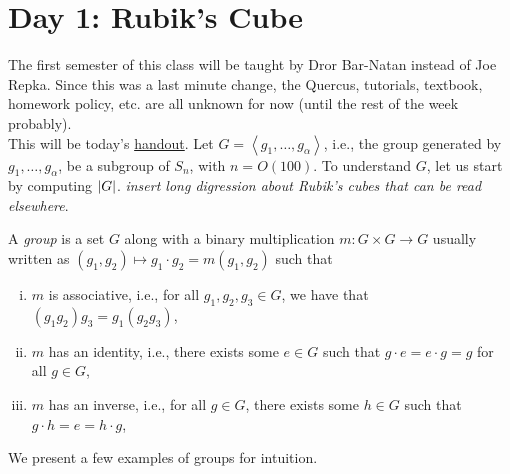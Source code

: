 \section{Day 1: Rubik's Cube}
The first semester of this class will be taught by Dror Bar-Natan instead of Joe Repka. Since this was a last minute change, the Quercus, tutorials, textbook, homework policy, etc. are all unknown for now (until the rest of the week probably).
\\[8pt]
This will be today's \href{https://www.math.toronto.edu/~drorbn/Talks/Cambridge-1301/}{handout}. Let $G = \left<g_1, \dots, g_\alpha\right>$, i.e., the group generated by $g_1, \dots, g_\alpha$, be a subgroup of $S_n$, with $n = O(100)$. To understand $G$, let us start by computing $\left\lvert G \right\rvert$. \textit{insert long digression about Rubik's cubes that can be read elsewhere}.
\begin{definition}
    A \textit{group} is a set $G$ along with a binary multiplication $m : G \times G \to G$ usually written as $(g_1, g_2) \mapsto g_1 \cdot g_2 = m(g_1, g_2)$ such that
    \begin{enumerate}[(i)]
        \item $m$ is associative, i.e., for all $g_1, g_2, g_3 \in G$, we have that $(g_1 g_2) g_3 = g_1 (g_2 g_3)$,
        \item $m$ has an identity, i.e., there exists some $e \in G$ such that $g \cdot e = e \cdot g = g$ for all $g \in G$,
        \item $m$ has an inverse, i.e., for all $g \in G$, there exists some $h \in G$ such that $g \cdot h = e = h \cdot g$,
    \end{enumerate}
\end{definition}
\noindent We present a few examples of groups for intuition.
